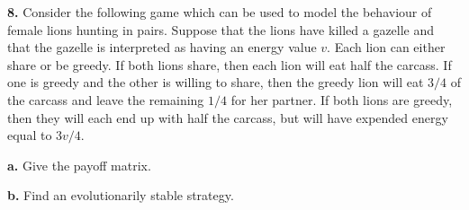 \documentclass[reqno,12pt]{amsart}
\begin{document}
\vspace{1cm}

\noindent
{\bf 8.}  Consider the following game which can be used to model
the behaviour of female lions hunting in pairs.  Suppose that the
lions have killed a gazelle and that the gazelle is interpreted
as having an energy value $v$.  Each lion can either share or be
greedy.  If both lions share, then each lion will eat half the
carcass.  If one is greedy and the other is willing to share,
then the greedy lion will eat $3/4$ of the carcass and leave
the remaining $1/4$ for her partner.  If both lions are greedy,
then they will each end up with half the carcass, but will have
expended energy equal to $3v/4$.

\noindent
{\bf a.}  Give the payoff matrix.

\noindent
{\bf b.}  Find an evolutionarily stable strategy.
\end{document}
